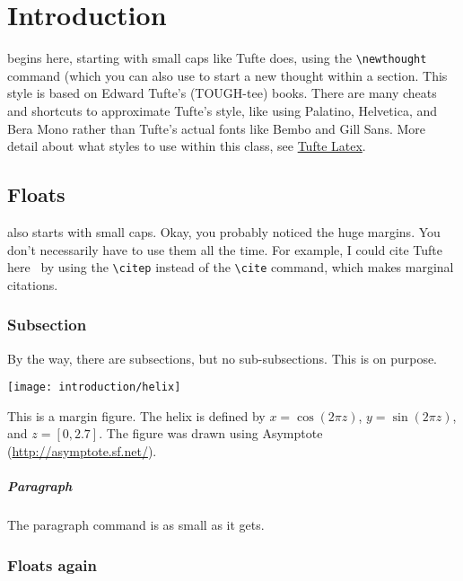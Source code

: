 \chapter{Introduction}
\label{chapter:introduction}

 begins here, starting with small caps like Tufte does, using the \verb|\newthought| command (which you can also use to start a new thought within a section. This style is based on Edward Tufte's (TOUGH-tee) books.\cite{Tufte2001,Tufte1990,Tufte1997,Tufte2006} There are many cheats and shortcuts to approximate Tufte's style, like using Palatino, Helvetica, and Bera Mono rather than Tufte's actual fonts like Bembo and Gill Sans. More detail about what styles to use within this class, see \href{https://ctan.org/pkg/tufte-latex}{Tufte Latex}.

\section{Floats}\label{sec:overview}

 also starts with small caps. Okay, you probably noticed the huge margins. You don't necessarily have to use them all the time. For example, I could cite Tufte here~\citep{Tufte2001} by using the \verb|\citep| instead of the \verb|\cite| command, which makes marginal citations.

\subsection{Subsection}

By the way, there are subsections, but no sub-subsections. This is on purpose.

\begin{marginfigure}%
  \texttt{[image: introduction/helix]}
  \caption{This is a margin figure.  The helix is defined by 
    $x = \cos(2\pi z)$, $y = \sin(2\pi z)$, and $z = [0, 2.7]$.  The figure was
    drawn using Asymptote (\url{http://asymptote.sf.net/}).}
  \label{fig:marginfig}
\end{marginfigure}

\paragraph{Paragraph} 

The paragraph command is as small as it gets.

\subsection{Floats again}

